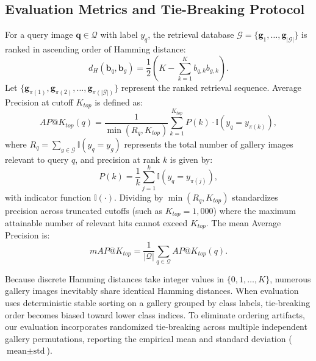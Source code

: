 \documentclass[10pt,conference]{IEEEtran}
\begin{document}
\subsection{Evaluation Metrics and Tie-Breaking Protocol}
For a query image $\mathbf{q} \in \mathcal{Q}$ with label $y_q$, the retrieval database $\mathcal{G} = \{\mathbf{g}_1, \dots, \mathbf{g}_{|\mathcal{G}|}\}$ is ranked in ascending order of Hamming distance:
\begin{equation}
    d_H(\mathbf{b}_q, \mathbf{b}_g) = \frac{1}{2} \left( K - \sum_{k=1}^K b_{q,k} b_{g,k} \right).
\end{equation}
Let $\{\mathbf{g}_{\pi(1)}, \mathbf{g}_{\pi(2)}, \dots, \mathbf{g}_{\pi(|\mathcal{G}|)}\}$ represent the ranked retrieval sequence. Average Precision at cutoff $K_{top}$ is defined as:
\begin{equation}
    AP@K_{top}(q) = \frac{1}{\min(R_q, K_{top})} \sum_{k=1}^{K_{top}} P(k) \cdot \mathbb{I}(y_q = y_{\pi(k)}),
\end{equation}
where $R_q = \sum_{g \in \mathcal{G}} \mathbb{I}(y_q = y_g)$ represents the total number of gallery images relevant to query $q$, and precision at rank $k$ is given by:
\begin{equation}
    P(k) = \frac{1}{k} \sum_{j=1}^k \mathbb{I}(y_q = y_{\pi(j)}),
\end{equation}
with indicator function $\mathbb{I}(\cdot)$. Dividing by $\min(R_q, K_{top})$ standardizes precision across truncated cutoffs (such as $K_{top} = 1,000$) where the maximum attainable number of relevant hits cannot exceed $K_{top}$. The mean Average Precision is:
\begin{equation}
    mAP@K_{top} = \frac{1}{|\mathcal{Q}|} \sum_{q \in \mathcal{Q}} AP@K_{top}(q).
\end{equation}

Because discrete Hamming distances take integer values in $\{0, 1, \dots, K\}$, numerous gallery images inevitably share identical Hamming distances. When evaluation uses deterministic stable sorting on a gallery grouped by class labels, tie-breaking order becomes biased toward lower class indices. To eliminate ordering artifacts, our evaluation incorporates randomized tie-breaking across multiple independent gallery permutations, reporting the empirical mean and standard deviation ($\text{mean} \pm \text{std}$).

\end{document}
